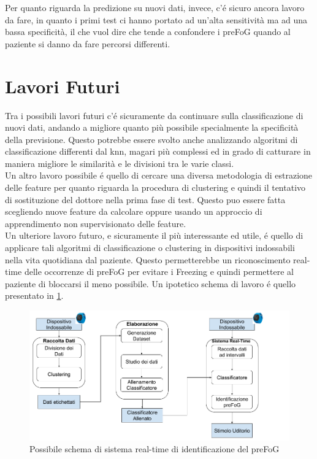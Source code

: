 Per quanto riguarda la predizione su nuovi dati, invece, c'é sicuro ancora lavoro da fare, in quanto i primi test ci hanno portato ad un'alta sensitività ma ad una bassa specificità, il che vuol dire che tende a confondere i preFoG quando al paziente si danno da fare percorsi differenti.
\section{Lavori Futuri}
Tra i possibili lavori futuri c'é sicuramente da continuare sulla classificazione di nuovi dati, andando a migliore quanto più possibile specialmente la specificità della previsione. Questo potrebbe essere svolto anche analizzando algoritmi di classificazione differenti dal knn, magari più complessi ed in grado di catturare in maniera migliore le similarità e le divisioni tra le varie classi.\\
Un altro lavoro possibile é quello di cercare una diversa metodologia di estrazione delle feature per quanto riguarda la procedura di clustering e quindi il tentativo di sostituzione del dottore nella prima fase di test. Questo puo essere fatta scegliendo nuove feature da calcolare oppure usando un approccio di apprendimento non supervisionato delle feature.\\
Un ulteriore lavoro futuro, e sicuramente il più interessante ed utile, é quello di applicare tali algoritmi di classificazione o clustering in dispositivi indossabili nella vita quotidiana dal paziente. Questo permetterebbe un riconoscimento real-time delle occorrenze di preFoG per evitare i Freezing e quindi permettere al paziente di bloccarsi il meno possibile. Un ipotetico schema di lavoro é quello presentato in \ref{LavoroFuturo}.

\begin{figure}[]
	\centering
	\includegraphics[scale=0.4]{images/LavoroFuturo.png}
	\caption{Possibile schema di sistema real-time di identificazione del preFoG}
	\label{LavoroFuturo}
\end{figure}